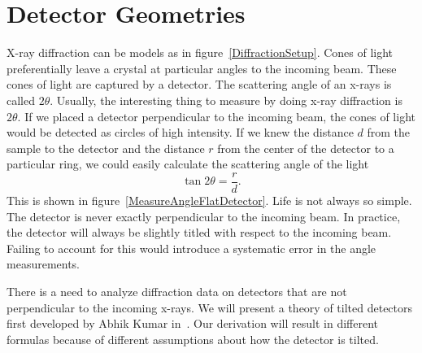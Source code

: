 \chapter{Detector Geometries}

\begin{SCfigure}[1][htbp]
    \centering
    
    \caption{An X-Ray diffraction setup. X-rays scatter from a 
    3-D sample and are captured by a 2-D detector. In this 
    setup, the detector is perpendicular to the incoming 
    x-ray beam.}
    \label{DiffractionSetup}
\end{SCfigure}

X-ray diffraction can be models as in figure~\ref{DiffractionSetup}. 
Cones of light preferentially leave a crystal at particular angles to 
the incoming beam. These cones of light are 
captured by a detector. The scattering angle 
of an x-rays is called 
$2\theta$. Usually, the interesting thing to measure by doing x-ray 
diffraction is $2\theta$. If we placed a detector perpendicular 
to the incoming beam, the cones of light would be detected as 
circles of high intensity. 
If we knew the distance $d$ from the sample to the detector and 
the distance $r$ from the center of the detector to a 
particular ring, we could easily calculate the scattering angle 
of the light 
\begin{equation}
    \tan2\theta = \frac{r}{d}.
\end{equation}
This is shown in figure~\ref{MeasureAngleFlatDetector}. 
Life is not always so simple. The detector is never
exactly perpendicular to the incoming beam.  In practice, 
the detector will always be slightly titled with respect 
to the incoming beam. Failing to account for this would
introduce a systematic error in the angle measurements.

\begin{SCfigure}[1][htbp]
    \centering
    
    \caption{The same setup as in figure~\ref{DiffractionSetup}. 
    $2\theta$ is the scattering angle of the light,
    $d$ is the distance 
    from the crystal to the detector, and $r$ is the distance 
    from the center of the detector.}
    \label{MeasureAngleFlatDetector}
\end{SCfigure}

There is a need to analyze diffraction data on detectors that are 
not perpendicular to the incoming x-rays. We will present a 
theory of tilted detectors first developed by Abhik Kumar 
in~\cite{Kumar05}. Our derivation will result in 
different formulas because of different assumptions
about how the detector is tilted. 

